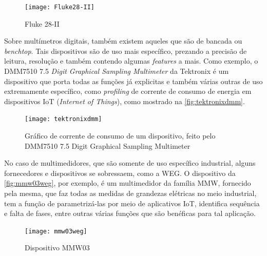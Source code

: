 \begin{figure}[htb!]%
    \caption{Fluke 28-II}%
    \label{fig:Fluke28-II}%
    \texttt{[image: Fluke28-II]}%
\end{figure}

Sobre multímetros digitais, também existem aqueles que são de bancada ou \textit{benchtop}. Tais dispositivos são de uso mais específico, prezando a precisão de leitura, resolução e também contendo algumas \textit{features} a mais. Como exemplo, o DMM7510 7.5 \textit{Digit Graphical Sampling Multimeter} da Tektronix é um dispositivo que porta todas as funções já explicitas e também várias outras de uso extremamente específico, como \textit{profiling} de corrente de consumo de energia em dispositivos \gls{IoT} (\textit{Internet of Things}), como mostrado na \autoref{fig:tektronixdmm}.

\begin{figure}[htb!]%
    \caption{Gráfico de corrente de consumo de um dispositivo, feito pelo DMM7510 7.5 Digit Graphical Sampling Multimeter}%
    \label{fig:tektronixdmm}%
    \texttt{[image: tektronixdmm]}%
\end{figure}

No caso de multimedidores, que são somente de uso específico industrial, alguns fornecedores e dispositivos se sobressaem, como a WEG. O dispositivo da \autoref{fig:mmw03weg}, por exemplo, é um multimedidor da família MMW, fornecido pela mesma, que faz todas as medidas de grandezas elétricas no meio industrial, tem a função de parametrizá-las por meio de aplicativos \gls{IoT}, identifica sequência e falta de fases, entre outras várias funções que são benéficas para tal aplicação.

\begin{figure}[htb!]%
    \caption{Dispositivo MMW03}%
    \label{fig:mmw03weg}%
    \texttt{[image: mmw03weg]}%
\end{figure}



